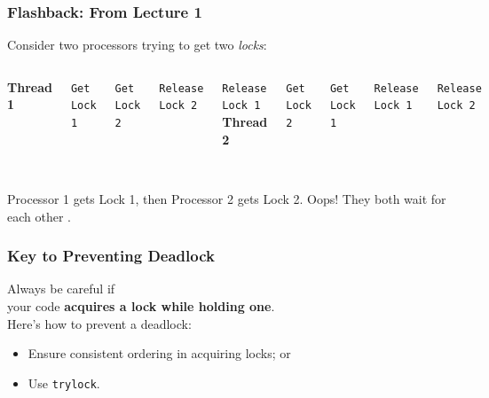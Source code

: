 \documentclass[aspectratio=43]{beamer}
\newenvironment{changemargin}[1]{%
  \begin{list}{}{%
    \setlength{\topsep}{0pt}%
    \setlength{\leftmargin}{#1}%
    \setlength{\rightmargin}{1em}
    \setlength{\listparindent}{\parindent}%
    \setlength{\itemindent}{\parindent}%
    \setlength{\parsep}{\parskip}%
  }%
  \item[]}{\end{list}}
\begin{document}
\begin{frame}[containsverbatim]
  \frametitle{Flashback: From Lecture 1}

  \begin{changemargin}{1cm}
     Consider two processors trying to get two {\it locks}:\\[1em]
  \begin{columns}
      {\bf Thread 1}

      \verb+Get Lock 1+

      \verb+Get Lock 2+

      \verb+Release Lock 2+

      \verb+Release Lock 1+
      {\bf Thread 2}

      \verb+Get Lock 2+

      \verb+Get Lock 1+

      \verb+Release Lock 1+

      \verb+Release Lock 2+
    \end{columns}~\\[1em]
     Processor 1 gets Lock 1, then Processor 2 gets Lock 2. Oops!
          They both wait for each other .
  \end{changemargin}
\end{frame}

\begin{frame}
  \frametitle{Key to Preventing Deadlock}

  \begin{changemargin}{2cm}

  Always be careful if \\
your code {\bf acquires a lock while holding one}.\\[1em]

  Here's how to prevent a deadlock:
  
  \begin{itemize}
    \item Ensure consistent ordering in acquiring locks; or
    \item Use {\tt trylock}.
  \end{itemize}
  \end{changemargin}
\end{frame}
\end{document}
